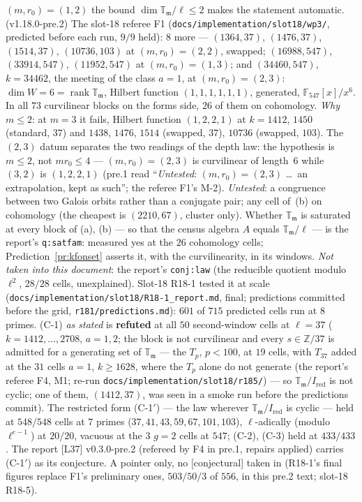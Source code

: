\documentclass[11pt]{article}
\theoremstyle{remark}
\newcommand{\F}{\mathbb{F}}
\newcommand{\Z}{\mathbb{Z}}
\DeclareMathOperator{\rank}{rank}
\newcommand{\T}{\mathbb{T}}
\newcommand{\m}{\mathfrak{m}}
\newcommand{\CONJ}{\textsf{[conjectural]}}
\begin{document}
$(m,r_0)=(1,2)$ the bound $\dim\T_\m/\ell\le2$ makes the statement automatic. (v1.18.0-pre.2) The slot-18 referee F1 (\texttt{docs/implementation/slot18/wp3/},
predicted before each run, $9/9$ held): $8$ more --- $(1364,37)$, $(1476,37)$, $(1514,37)$, $(10736,103)$ at $(m,r_0)=(2,2)$, swapped; $(16988,547)$, $(33914,547)$,
$(11952,547)$ at $(m,r_0)=(1,3)$; and $(34460,547)$, $k=34462$, the meeting of the class $a=1$, at $(m,r_0)=(2,3)$: $\dim W=6=\rank\T_\m$, Hilbert function
$(1,1,1,1,1,1)$, generated, $\F_{547}[x]/x^6$. In all $73$ curvilinear blocks on the forms side, $26$ of them on cohomology. \emph{Why $m\le2$}: at $m=3$ it
fails, Hilbert function $(1,2,2,1)$ at $k=1412$, $1450$ (standard, $37$) and $1438$, $1476$, $1514$ (swapped, $37$), $10736$ (swapped, $103$). The $(2,3)$ datum
separates the two readings of the depth law: the hypothesis is $m\le2$, not $m r_0\le4$ --- $(m,r_0)=(2,3)$ is curvilinear of length~$6$ while $(3,2)$ is
$(1,2,2,1)$ (pre.1 read ``\emph{Untested}: $(m,r_0)=(2,3)$ \ldots\ an extrapolation, kept as such''; the referee F1's M-2). \emph{Untested}: a congruence between two Galois orbits rather than a conjugate pair; any cell of~(b)
on cohomology (the cheapest is $(2210,67)$, cluster only). Whether $\T_\m$ is saturated at every block of (a), (b) --- so that the census algebra $A$ equals
$\T_\m/\ell$ --- is the report's \texttt{q:satfam}: measured yes at the $26$ cohomology cells; Prediction~\ref{pr:kfonset} asserts it, with the
curvilinearity, in its windows. \emph{Not taken into this document}: the report's \texttt{conj:law} (the reducible quotient modulo~$\ell^{2}$, $28/28$
cells, unexplained). Slot-18 R18-1 tested it at scale (\texttt{docs/implementation/slot18/R18-1\_report.md}, final; predictions committed
before the grid, \texttt{r181/predictions.md}): $601$ of $715$ predicted cells run at $8$ primes. (C-1) \emph{as stated} is \textbf{refuted} at all $50$
second-window cells at $\ell=37$ ($k=1412,\dots,2708$, $a=1,2$; the block is not curvilinear and every $s\in\Z/37$ is admitted for a generating set
of $\T_\m$ --- the $T_p$, $p<100$, at $19$ cells, with $T_{37}$ added at the $31$ cells $a=1$, $k\ge1628$, where the $T_p$ alone do not generate
(the report's referee F4, M1; re-run \texttt{docs/implementation/slot18/r185/}) --- so $\T_\m/I_{\mathrm{red}}$ is not cyclic; one of them, $(1412,37)$,
was seen in a smoke run before the predictions commit). The restricted form
(C-1$'$) --- the law wherever $\T_\m/I_{\mathrm{red}}$ is cyclic --- held at $548/548$ cells at $7$ primes ($37,41,43,59,67,101,103$), $\ell$-adically
(modulo $\ell^{e-1}$) at $20/20$, vacuous at the $3$ $g=2$ cells at $547$; (C-2), (C-3) held at $433/433$. The report [L37] v0.3.0-pre.2 (refereed by F4 in pre.1, repairs applied) carries (C-1$'$)
as its conjecture. A pointer only, no \CONJ{} taken in (R18-1's final figures replace F1's preliminary ones, $503/50/3$ of $556$, in this pre.2
text; slot-18 R18-5).
\end{document}
